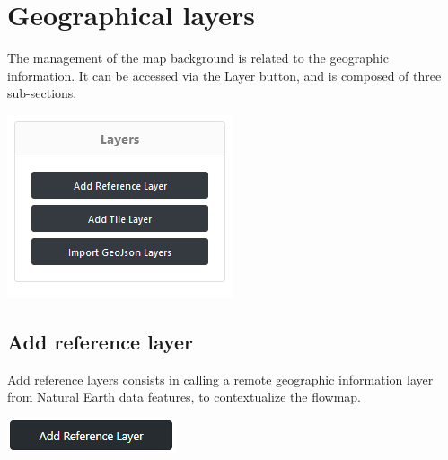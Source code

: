 \documentclass[
  letterpaper,
  DIV=11,
  numbers=noendperiod]{scrreprt}
\begin{document}
\section{Geographical layers}\label{geographical-layers}

The management of the map background is related to the geographic
information. It can be accessed via the Layer button, and is composed of
three sub-sections.

\begin{center}
\includegraphics{images/Geo_layers.PNG}
\end{center}

\subsection{Add reference layer}\label{add-reference-layer}

Add reference layers consists in calling a remote geographic information
layer from Natural Earth data features, to contextualize the flowmap.

\begin{center}
\includegraphics{images/Add_reference_layer.PNG}
\end{center}
\end{document}
